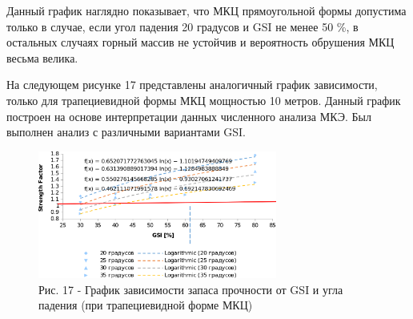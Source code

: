 \begin{multicols}{2}
Данный график наглядно показывает, что МКЦ прямоугольной формы допустима
только в случае, если угол падения 20 градусов и GSI не менее 50 \%, в
остальных случаях горный массив не устойчив и вероятность обрушения МКЦ
весьма велика.

На следующем рисунке 17 представлены аналогичный график зависимости,
только для трапециевидной формы МКЦ мощностью 10 метров. Данный график
построен на основе интерпретации данных численного анализа МКЭ. Был
выполнен анализ с различными вариантами GSI.
\end{multicols}

\begin{figure}[H]
	\centering
	\includegraphics[width=0.7\textwidth]{assets/295.2}
	\caption*{Рис. 17 - График зависимости запаса прочности от GSI и угла падения (при трапециевидной форме МКЦ)}
\end{figure}

